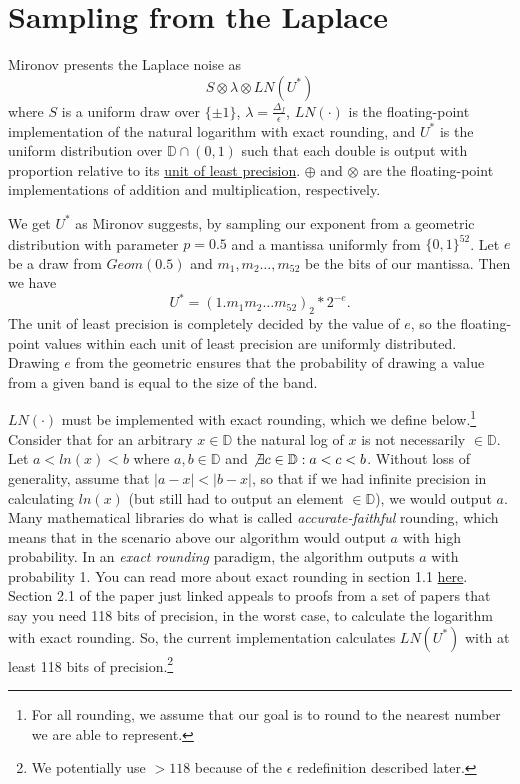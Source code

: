 \documentclass[11pt]{scrartcl} %
\begin{document}
\section{Sampling from the Laplace}
\label{sec:sampling_from_laplace}
Mironov presents the Laplace noise as
\[ S \otimes \lambda \otimes LN(U^*) \]
where $S$ is a uniform draw over $\{\pm 1\}$, $\lambda = \frac{\Delta_f}{\epsilon}$, $LN(\cdot)$ is the floating-point implementation of the natural logarithm with exact rounding, and $U^*$ is the uniform distribution over $\mathbb{D} \cap (0,1)$ such that each double is output with proportion relative to its \href{https://en.wikipedia.org/wiki/Unit_in_the_last_place}{unit of least precision}. $\oplus$ and $\otimes$ are the floating-point implementations of addition and multiplication, respectively. \newline

We get $U^*$ as Mironov suggests, by sampling our exponent from a geometric distribution with parameter $p = 0.5$ and a mantissa uniformly from $\{0,1\}^{52}$. Let $e$ be a draw from $Geom(0.5)$ and $m_1, m_2 \hdots, m_{52}$ be the bits of our mantissa. Then we have
\[ U^{*} = (1.m_1m_2 \hdots m_{52})_2 * 2^{- e}. \]
The unit of least precision is completely decided by the value of $e$, so the floating-point values within each unit of least precision are uniformly distributed. Drawing $e$ from the geometric ensures that the probability of drawing a value from a given band is equal to the size of the band. \newline

$LN(\cdot)$ must be implemented with exact rounding, which we define below.\footnote{For all rounding, we assume that our goal is to round to the nearest number we are able to represent.} Consider that for an arbitrary $x \in \mathbb{D}$ the natural log of $x$ is not necessarily $\in \mathbb{D}$. Let $a < ln(x) < b$ where $a,b \in \mathbb{D}$ and $\not\exists c \in \mathbb{D}: a < c < b$. Without loss of generality, assume that $\vert a-x \vert < \vert b - x \vert$, so that if we had infinite precision in calculating $ln(x)$ (but still had to output an element $\in \mathbb{D}$), we would output $a$.
Many mathematical libraries do what is called \textit{accurate-faithful} rounding, which means that in the scenario above our algorithm would output $a$ with high probability. In an \textit{exact rounding} paradigm, the algorithm outputs $a$ with probability 1. You can read more about exact rounding in section 1.1 \href{http://www.ens-lyon.fr/LIP/Pub/Rapports/RR/RR2005/RR2005-37.pdf}{here}. Section 2.1 of the paper just linked appeals to proofs from a set of papers that say you need 118 bits of precision, in the worst case, to calculate the logarithm with exact rounding. So, the current implementation calculates $LN(U^*)$ with at least 118 bits of precision.\footnote{We potentially use $> 118$ because of the $\epsilon$ redefinition described later.} \newline
\end{document}
